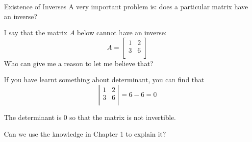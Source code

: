 \documentclass{beamer}
\begin{document}
\begin{frame}{Existence of Inverses}
A very important problem is: does a particular matrix have an inverse?

\vspace{3pt}
I say that the matrix $A$ below cannot have an inverse:
\begin{equation*}
    A=\left[ \begin{matrix}
        1&		2\\
        3&		6\\
    \end{matrix} \right]
\end{equation*}
Who can give me a reason to let me believe that?

If you have learnt something about determinant, you can find that
\begin{equation*}
    \left| \begin{matrix}
        1&		2\\
        3&		6\\
    \end{matrix} \right|=6-6=0
\end{equation*}

The determinant is 0 so that the matrix is not invertible.

\vspace{3pt}
Can we use the knowledge in Chapter 1 to explain it?
\end{frame}
\end{document}
